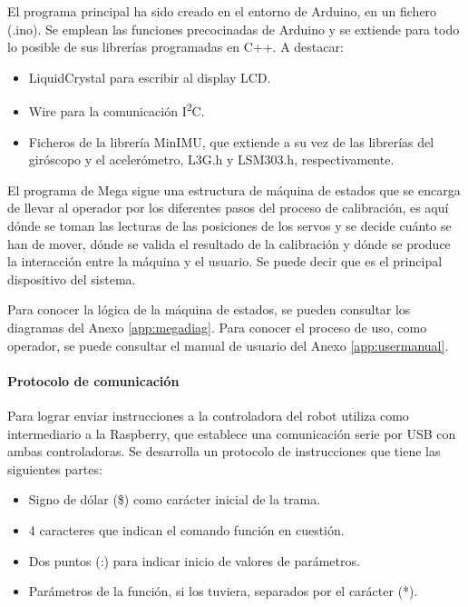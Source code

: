 El programa principal ha sido creado en el entorno de Arduino, en un fichero (.ino). Se emplean las funciones precocinadas de Arduino y se extiende para todo lo posible de sus librerías programadas en C++. A destacar:
\begin{itemize}
  \item LiquidCrystal para escribir al display LCD.
  \item Wire para la comunicación  I\textsuperscript{2}C.
  \item Ficheros de la librería MinIMU, que extiende a su vez de las librerías del giróscopo y el acelerómetro, L3G.h y LSM303.h, respectivamente.
\end{itemize}

El programa de Mega sigue una estructura de máquina de estados que se encarga de llevar al operador por los diferentes pasos del proceso de calibración, es aquí dónde se toman las lecturas de las posiciones de los servos y se decide cuánto se han de mover, dónde se valida el resultado de la calibración y dónde se produce la interacción entre la máquina y el usuario. Se puede decir que es el principal dispositivo del sistema.

Para conocer la lógica de la máquina de estados, se pueden consultar los diagramas del Anexo \ref{app:megadiag}. Para conocer el proceso de uso, como operador, se puede consultar el manual de usuario del Anexo \ref{app:usermanual}.

\paragraph{Protocolo de comunicación}

Para lograr enviar instrucciones a la controladora del robot utiliza como intermediario a la Raspberry, que establece una comunicación serie por USB con ambas controladoras. Se desarrolla un protocolo de instrucciones que tiene las siguientes partes:

\begin{itemize}
  \item Signo de dólar (\$) como carácter inicial de la trama.
  \item 4 caracteres que indican el comando función en cuestión.
  \item Dos puntos (:) para indicar inicio de valores de parámetros.
  \item Parámetros de la función, si los tuviera, separados por el carácter (*).
\end{itemize}

